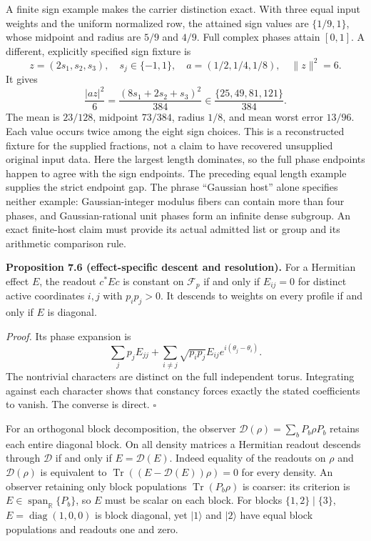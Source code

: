 \documentclass[
  11pt,
]{article}
\begin{document}
A finite sign example makes the carrier distinction exact. With three equal
input weights and the uniform normalized row, the attained sign values are
\(\{1/9,1\}\), whose midpoint and radius are \(5/9\) and \(4/9\). Full complex
phases attain \([0,1]\). A different, explicitly specified sign fixture is
\[
z=(2s_1,s_2,s_3),\quad s_j\in\{-1,1\},\quad
 a=(1/2,1/4,1/8),\quad \lVert z\rVert^2=6.
\]
It gives
\[
\frac{|az|^2}{6}=\frac{(8s_1+2s_2+s_3)^2}{384}
 \in\frac{\{25,49,81,121\}}{384}.
\]
The mean is \(23/128\), midpoint \(73/384\), radius \(1/8\), and mean worst error
\(13/96\). Each value occurs twice among the eight sign choices. This is a
reconstructed fixture for the supplied fractions, not a claim to have recovered
unsupplied original input data. Here the largest length dominates, so the full
phase endpoints happen to agree with the sign endpoints. The preceding equal
length example supplies the strict endpoint gap. The phrase ``Gaussian host''
alone specifies neither example: Gaussian-integer modulus fibers can contain
more than four phases, and Gaussian-rational unit phases form an infinite dense
subgroup. An exact finite-host claim must provide its actual admitted list or
group and its arithmetic comparison rule.

\textbf{Proposition 7.6 (effect-specific descent and resolution).} For a Hermitian
effect \(E\), the readout \(c^*Ec\) is constant on \(\mathcal F_p\) if and only if
\(E_{ij}=0\) for distinct active coordinates \(i,j\) with \(p_ip_j>0\). It descends
to weights on every profile if and only if \(E\) is diagonal.

\emph{Proof.} Its phase expansion is
\[
\sum_jp_jE_{jj}+\sum_{i\ne j}\sqrt{p_ip_j}E_{ij}
                               e^{i(\theta_j-\theta_i)}.
\]
The nontrivial characters are distinct on the full independent torus.
Integrating against each character shows that constancy forces exactly the
stated coefficients to vanish. The converse is direct. \(\square\)

For an orthogonal block decomposition, the observer
\(\mathcal D(\rho)=\sum_bP_b\rho P_b\) retains each entire diagonal block.
On all density matrices a Hermitian readout descends through \(\mathcal D\)
if and only if \(E=\mathcal D(E)\). Indeed equality of the readouts on
\(\rho\) and \(\mathcal D(\rho)\) is equivalent to
\(\operatorname{Tr}((E-\mathcal D(E))\rho)=0\) for every density.
An observer retaining only block populations \(\operatorname{Tr}(P_b\rho)\)
is coarser: its criterion is \(E\in\operatorname{span}_{\mathbb R}\{P_b\}\),
so \(E\) must be scalar on each block. For blocks \(\{1,2\}\mid\{3\}\),
\(E=\operatorname{diag}(1,0,0)\) is block diagonal, yet \(|1\rangle\) and
\(|2\rangle\) have equal block populations and readouts one and zero.
\end{document}
